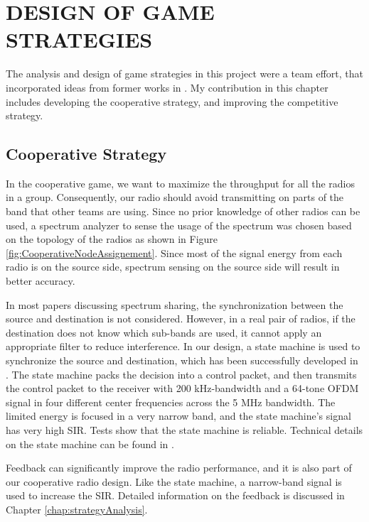 
%
%

\chapter{DESIGN OF GAME STRATEGIES}
\label{chap:strategy}
The analysis and design of game strategies in this project were a team effort, that incorporated ideas from former works in \cite{FanZhang2013, MingmingCai2013, ChaoLuo2013}. My contribution in this chapter includes developing the cooperative strategy, and improving the competitive strategy.


\section{Cooperative Strategy}
In the cooperative game, we want to maximize the throughput for all the radios in a group. Consequently, our radio should avoid transmitting on parts of the band that other teams are using. Since no prior knowledge of other radios can be used, a spectrum analyzer to sense the usage of the spectrum was chosen based on the topology of the radios as shown in Figure \ref{fig:CooperativeNodeAssignement}. Since most of the signal energy from each radio is on the source side, spectrum sensing on the source side will result in better accuracy.

In most papers discussing spectrum sharing, the synchronization between the source and destination is not considered. However, in a real pair of radios, if the destination does not know which sub-bands are used, it cannot apply an appropriate filter to reduce interference. In our design, a state machine is used to synchronize the source and destination, which has been successfully developed in \cite{FanZhang2013}. The state machine packs the decision into a control packet, and then transmits the control packet to the receiver with 200 kHz-bandwidth and a 64-tone OFDM signal in four different center frequencies across the 5 MHz bandwidth. The limited energy is focused in a very narrow band, and the state machine's signal has very high SIR. Tests show that the state machine is reliable. Technical details on the state machine can be found in \cite{FanZhang2013}.

Feedback can significantly improve the radio performance, and it is also part of our cooperative radio design. Like the state machine, a narrow-band signal is used to increase the SIR. Detailed information on the feedback is discussed in Chapter \ref{chap:strategyAnalysis}.

